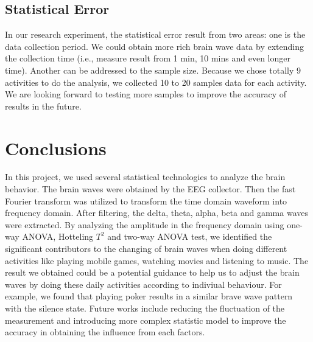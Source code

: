 \documentclass[letterpaper,twocolumn,10pt]{article}
\begin{document}
\subsection{Statistical Error}

In our research experiment, the statistical error result from two areas: one is the data collection period. We could obtain more rich brain wave data by extending the collection time (i.e., measure result from 1 min, 10 mins and even longer time). Another can be addressed to the sample size. Because we chose totally 9 activities to do the analysis, we collected 10 to 20 samples data for each activity. We are looking forward to testing more samples to improve the accuracy of results in the future.


\section{Conclusions}
In this project, we used several statistical technologies to analyze the brain behavior. The brain waves were obtained by the EEG collector. Then the fast Fourier transform was utilized to transform the time domain waveform into frequency domain. After filtering, the delta, theta, alpha, beta and gamma waves were extracted. By analyzing the amplitude in the frequency domain using one-way ANOVA, Hotteling $T^2$ and two-way ANOVA test, we identified the significant contributors to the changing of brain waves when doing different activities like playing mobile games, watching movies and listening to music. The result we obtained could be a potential guidance to help us to adjust the brain waves by doing these daily activities according to indiviual behaviour. For example, we found that playing poker results in a similar brave wave pattern with the silence state. Future works include reducing the fluctuation of the measurement and introducing more complex statistic model to improve the accuracy in obtaining the influence from each factors.

{\normalsize

% 
}


\end{document}

